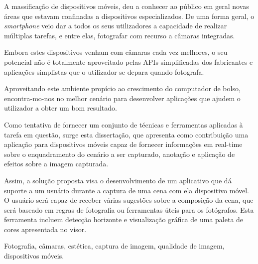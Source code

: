 \abstractPT 
A massificação de dispositivos móveis, deu a conhecer ao público em geral novas áreas que estavam confinadas a dispositivos especializados. De uma forma geral, o \emph{smartphone} veio dar a todos os seus utilizadores a capacidade de realizar múltiplas tarefas, e entre elas, fotografar com recurso a câmaras integradas.


Embora estes dispositivos venham com câmaras cada vez melhores, o seu potencial não é totalmente aproveitado pelas APIs simplificadas dos fabricantes e aplicações simplistas que o utilizador se depara quando fotografa.


Aproveitando este ambiente propício ao crescimento do computador de bolso, encontra-mo-nos no melhor cenário para desenvolver aplicações que ajudem o utilizador a obter um bom resultado.


Como tentativa de fornecer um conjunto de técnicas e ferramentas aplicadas à tarefa em questão, surge esta dissertação, que apresenta como contribuição uma aplicação para dispositivos móveis capaz de fornecer informações em real-time sobre o enquadramento do cenário a ser capturado, anotação e aplicação de efeitos sobre a imagem capturada.



Assim, a solução proposta visa o desenvolvimento de um aplicativo que dá suporte a um usuário durante a captura de uma cena com ela dispositivo móvel. O usuário será capaz de receber várias sugestões sobre a composição da cena, que será baseado em regras de fotografia ou ferramentas úteis para os fotógrafos. Esta ferramenta incluem detecção horizonte e visualização gráfica de uma paleta de cores apresentada no visor.

\begin{keywords}
Fotografia, câmaras, estética, captura de imagem, qualidade de imagem, dispositivos móveis.
\end{keywords}
